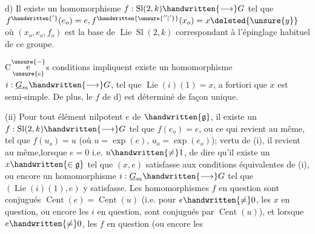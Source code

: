 d) Il existe un homomorphisme $f:\operatorname{Sl}(2,k)\handwritten{\longrightarrow}G$ tel que $f^{\handwritten{'}}(e_o)=e,f^{\handwritten{\unsure{''|'}}}(x_o)=x\deleted{\unsure{y}}$ où $(x_o,e_o,f_o)$ est la base de $\operatorname{Lie}\operatorname{Sl}(2,k)$ correspondant à l'épinglage habituel de ce groupe.

C$\overset{\unsure{-}}{\underset{\text{\unsure{e}}}{\text{e}}}$s conditions impliquent  existe un homomorphisme $i:\underline{G}_m\handwritten{\longrightarrow}G$, tel que $\operatorname{Lie}(i)(1)=x$, a fortiori que $x$ est semi-simple. De plus, le $f$ de d) est déterminé de façon unique.

(ii) Pour tout élément nilpotent $e$ de $\handwritten{\mathfrak{g}}$, il existe un  $f:\operatorname{Sl}(2,k)\handwritten{\longrightarrow}G$ tel que $f(e_o)=e$, ou ce qui revient au même, tel que $f(u_o)=u$ (où $u=\exp(e)$, $u_o=\exp(e_o)$);  vertu de (i), il revient au même,\deleted{\unsure{(}}lorsque $e=0$ i.e. $u\handwritten{\ne}1$, de dire qu'il existe un $x\handwritten{\in\mathfrak{g}}$ tel que $(x,e)$ satisfasse aux conditions équivalentes de (i), ou encore un homomorphisme $i:\underline{G}_m\handwritten{\longrightarrow}G$ tel que $(\operatorname{Lie}(i)(1),e)$ y satisfasse. Les homomorphismes $f$ en question sont conjugués $\operatorname{Cent}(e)=\operatorname{Cent}(u)$ (i.e. pour $e\handwritten{\ne}0$, les $x$ en question, ou encore les $i$ en question, sont conjugués  par $\operatorname{Cent}(u)$), et lorsque $e\handwritten{\ne}0$, les  $f$ en question (ou encore les

